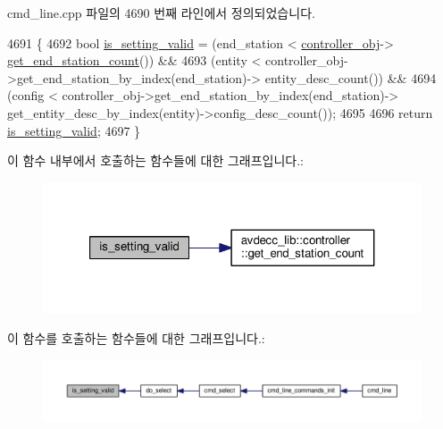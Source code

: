 cmd\+\_\+line.\+cpp 파일의 4690 번째 라인에서 정의되었습니다.


\begin{DoxyCode}
4691 \{
4692     \textcolor{keywordtype}{bool} \hyperlink{classcmd__line_a52a88a9e3c1e1e6fea1865df944e3443}{is\_setting\_valid} = (end\_station < \hyperlink{classcmd__line_af0a7784509e5bf1210a2aa19cea5df70}{controller\_obj}->
      \hyperlink{classavdecc__lib_1_1controller_ab5ddf7b4a9718fe3e821289141f44485}{get\_end\_station\_count}()) &&
4693                             (entity < controller\_obj->get\_end\_station\_by\_index(end\_station)->
      entity\_desc\_count()) &&
4694                             (config < controller\_obj->get\_end\_station\_by\_index(end\_station)->
      get\_entity\_desc\_by\_index(entity)->config\_desc\_count());
4695 
4696     \textcolor{keywordflow}{return} \hyperlink{classcmd__line_a52a88a9e3c1e1e6fea1865df944e3443}{is\_setting\_valid};
4697 \}
\end{DoxyCode}


이 함수 내부에서 호출하는 함수들에 대한 그래프입니다.\+:
\nopagebreak
\begin{figure}[H]
\begin{center}
\leavevmode
\includegraphics[width=321pt]{classcmd__line_a52a88a9e3c1e1e6fea1865df944e3443_cgraph}
\end{center}
\end{figure}




이 함수를 호출하는 함수들에 대한 그래프입니다.\+:
\nopagebreak
\begin{figure}[H]
\begin{center}
\leavevmode
\includegraphics[width=350pt]{classcmd__line_a52a88a9e3c1e1e6fea1865df944e3443_icgraph}
\end{center}
\end{figure}


